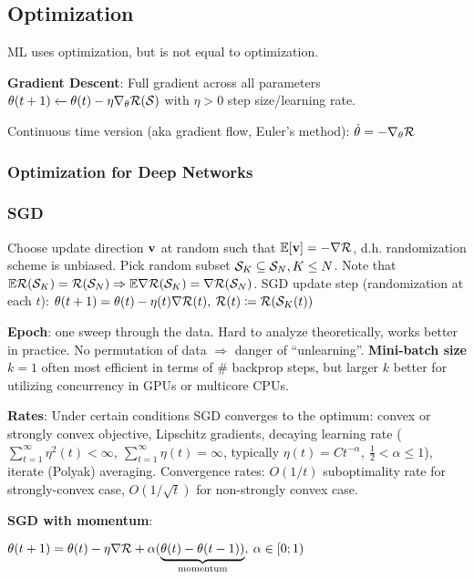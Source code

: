 \subsection{Optimization}
\label{sub:optimization}
    ML uses optimization, but is not equal to optimization.
    
    \textbf{Gradient Descent}: Full gradient across all parameters\\
    \tab$\theta(t+1)\xleftarrow{}\theta(t)-\eta\nabla_\theta\mathcal{R}(\mathcal{S})$ with $\eta > 0$ step size/learning rate.
    
    Continuous time version (aka gradient flow, Euler's method): $\Dot{\theta}=-\nabla_\theta\mathcal{R}$
    
    \subsubsection{Optimization for Deep Networks}
    
    \subsubsection{SGD}
    \label{ssub:sgd}
        Choose update direction $\mathbf v$ at random such that $\mathbb E\lbrack\mathbf v\rbrack=-\nabla\mathcal{R}$, d.h. randomization scheme is unbiased. Pick random subset $\mathcal{S}_K\subseteq\mathcal{S}_N, K\leq N$. Note that $\mathbb E\mathcal{R}(\mathcal{S}_K)=\mathcal{R}(\mathcal{S}_N)\Rightarrow\mathbb E\nabla\mathcal{R}(\mathcal{S}_K)=\nabla\mathcal{R}(\mathcal{S}_N)$. SGD update step (randomization at each $t$): \tab$\theta(t+1)=\theta(t)-\eta(t)\nabla\mathcal{R}(t),\>\mathcal{R}(t)\coloneqq\mathcal{R}(\mathcal{S}_K(t))$
        
        \textbf{Epoch}: one sweep through the data. Hard to analyze theoretically, works better in practice. No permutation of data $\Rightarrow$ danger of ``unlearning''.
        \textbf{Mini-batch size} $k=1$ often most efficient in terms of \# backprop steps, but larger $k$ better for utilizing concurrency in GPUs or multicore CPUs.
        
        \textbf{Rates}: Under certain conditions SGD converges to the optimum: convex or strongly convex objective, Lipschitz gradients, decaying learning rate ($\sum^\infty_{t=1}\eta^2(t)<\infty,\>\sum^\infty_{t=1}\eta(t)=\infty$, typically $\eta(t)=C t^{-\alpha},\>\frac{1}{2}<\alpha\leq1$), iterate (Polyak) averaging. Convergence rates: $O(1/t)$ suboptimality rate for strongly-convex case, $O(1/\sqrt{t})$ for non-strongly convex case.
        
        \textbf{SGD with momentum}:
        
        \tab$\theta(t+1)=\theta(t)-\eta\nabla\mathcal{R}+\alpha(\underbrace{\theta(t)-\theta(t-1))}_\text{momentum},\>\alpha\in\lbrack0;1)$
        
